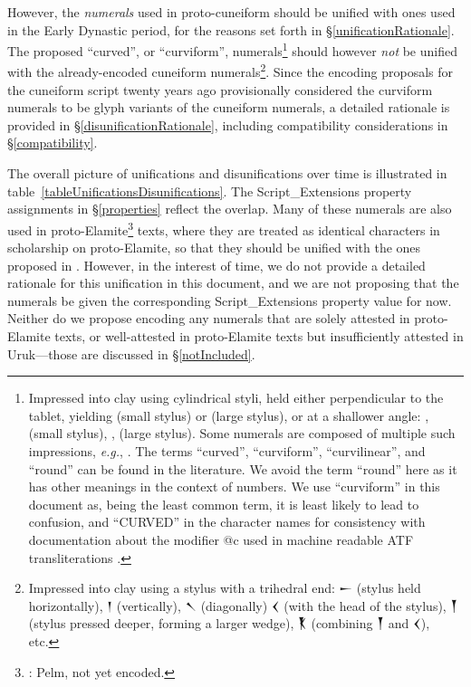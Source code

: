 \documentclass[10pt, a4paper, twoside]{article}
\newcommand\oneAšC{{\proposalfont\symbol{"12550}}} %
\newcommand\oneDišC{{\proposalfont\symbol{"12559}}}
\newcommand\oneUC{{\proposalfont\symbol{"12562}}}
\newcommand\oneŊešTwoC{{\proposalfont\symbol{"1256B}}}
\newcommand\oneŊešʾuC{{\proposalfont\symbol{"12574}}}
\newcommand\oneŠarTwoC{{\proposalfont\symbol{"12579}}}
\newcommand\oneŠarʾuC{{\proposalfont\symbol{"12582}}}
\newcommand\oneNThirtyNineA{{\proposalfont\symbol{"125B6}}}
\newcommand{\exempligratia}{\emph{e.g.}}
\begin{document}
However, the \emph{numerals} used in proto-cuneiform should be unified with
ones used in the Early Dynastic period, for the reasons set forth in
§\ref{unificationRationale}.
The proposed ``curved'', or ``curviform'', numerals\footnote{%
Impressed into clay using cylindrical styli,
held either perpendicular to the tablet, yielding
\oneUC{} (small stylus) or
\oneŠarTwoC{} (large stylus),
or at a shallower angle:
\oneAšC, \oneDišC{} (small stylus),
\oneŊešTwoC{}, \oneNThirtyNineA{} (large stylus).
Some numerals are composed of multiple such impressions,
\exempligratia, \oneŊešʾuC.
The terms ``curved'', ``curviform'', ``curvilinear'', and ``round''
can be found in the literature.
We avoid the term ``round'' here as it has other meanings
in the context of numbers.
We use ``curviform'' in this document as, being the least
common term, it is least likely to lead to confusion,
and ``CURVED'' in the character names for consistency
with documentation about the modifier @c used in machine
readable ATF transliterations \cite{inlineATF}.}
should however \emph{not} be unified with
the already-encoded cuneiform numerals\footnote{%
Impressed into clay using a stylus with a trihedral end:
{\xsuxfont 𒀸} (stylus held horizontally),
{\xsuxfont 𒁹} (vertically),
{\xsuxfont 𒀹} (diagonally)
{\xsuxfont 𒌋} (with the head of the stylus),
{\xsuxfont 𒐕} (stylus pressed deeper, forming a larger wedge),
{\xsuxfont 𒐞} (combining {\xsuxfont 𒐕} and {\xsuxfont 𒌋}), etc.}.
Since the encoding proposals for the cuneiform script
twenty years ago provisionally considered the curviform numerals
to be glyph variants of the cuneiform numerals,
a detailed rationale is provided in §\ref{disunificationRationale},
including compatibility considerations in §\ref{compatibility}.

The overall picture of unifications and disunifications over time is illustrated in table~\ref{tableUnificationsDisunifications}.
The Script\_Extensions property assignments in §\ref{properties} reflect the overlap.
Many of these numerals are also used in proto-Elamite\footnote{\cite{ISO15924}: Pelm, not yet encoded.} texts,
where they are treated as identical characters in scholarship on proto-Elamite,
so that they should be unified with the ones proposed in \cite{L2/23-196}.
However, in the interest of time, we do not provide a detailed rationale for this unification in this document,
and we are not proposing that the numerals be given the corresponding Script\_Extensions property value for now.
Neither do we propose encoding any numerals that are solely attested in proto-Elamite texts,
or well-attested in proto-Elamite texts but insufficiently attested in Uruk---those are discussed in §\ref{notIncluded}.
\end{document}
